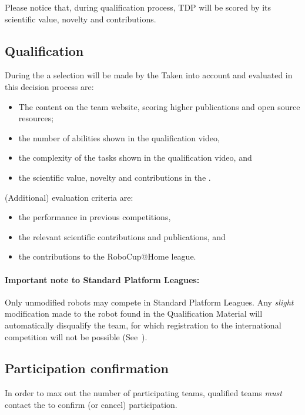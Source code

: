Please notice that, during qualification process, TDP will be scored by its scientific value, novelty and contributions.


\subsection{Qualification}
\label{rule:qualification}

During the  a selection will be made by the  Taken into account and evaluated in this decision process are:
\begin{itemize}
	\item The content on the team website, scoring higher publications and open source resources;
	\item the number of abilities shown in the qualification video,
	\item the complexity of the tasks shown in the qualification video, and
	\item the scientific value, novelty and contributions in the . %
\end{itemize}
(Additional) evaluation criteria are:
\begin{itemize}
	\item the performance in previous competitions,
	\item the relevant scientific contributions and publications, and
	\item the contributions to the RoboCup@Home league.
\end{itemize}


\paragraph{Important note to Standard Platform Leagues:} Only unmodified robots may compete in Standard Platform Leagues. Any \textit{slight} modification made to the robot found in the Qualification Material will automatically disqualify the team, for which registration to the international competition will not be possible  (See~).

\subsection{Participation confirmation}
\label{rule:participation-confirmation}
In order to max out the number of participating teams, qualified teams \emph{must} contact the  to confirm (or cancel) participation.

